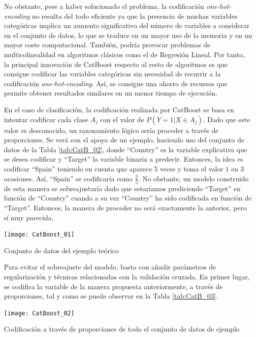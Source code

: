 \documentclass[12pt,twoside]{article}
\begin{document}
No obstante, pese a haber solucionado el problema, la codificación \textit{one-hot-encoding} no resulta del todo eficiente ya que la presencia de muchas variables categóricas implica un aumento significativo del número de variables a considerar en el conjunto de datos, lo que se traduce en un mayor uso de la memoria y en un mayor coste computacional. También, podría provocar problemas de multicolinealidad en algoritmos clásicos como el de Regresión Lineal. Por tanto, la principal innovación de CatBoost respecto al resto de algoritmos es que consigue codificar las variables categóricas sin necesidad de recurrir a la codificación \textit{one-hot-encoding}. Así, se consigue una ahorro de recursos que permite obtener resultados similares en un menor tiempo de ejecución.

En el caso de clasificación, la codificación realizada por CatBoost se basa en intentar codificar cada clase $A_j$ con el valor de $P(Y = 1 | X \in A_j)$. Dado que este valor es desconocido, un razonamiento lógico sería proceder a través de proporciones. Se verá con el apoyo de un ejemplo, haciendo uso del conjunto de datos de la Tabla \ref{tab:CatB_02}, donde ``Country'' es la variable explicativa que se desea codificar y ``Target'' la variable binaria a predecir. Entonces, la idea es codificar ``Spain'' teniendo en cuenta que aparece 5 veces y toma el valor $1$ en 3 ocasiones. Así, ``Spain'' se codificaría como $\frac{3}{5}$. No obstante, un modelo construido de esta manera se sobreajustaría dado que estaríamos prediciendo ``Target'' en función de ``Country'' cuando a su vez ``Country'' ha sido codificada en función de ``Target''. Entonces, la manera de proceder no será exactamente la anterior, pero sí muy parecida.

\begin{table}[h]
\centering
\texttt{[image: CatBoost\_01]}
\caption{Conjunto de datos del ejemplo teórico}
\label{tab:CatB_02}
\end{table}

Para evitar el sobreajuste del modelo, basta con añadir parámetros de regularización y técnicas relacionadas con la validación cruzada. En primer lugar, se codifica la variable de la manera propuesta anteriormente, a través de proporciones, tal y como se puede observar en la Tabla \ref{tab:CatB_03}.
\begin{table}[h]
\centering
\texttt{[image: CatBoost\_02]}
\caption{Codificación a través de proporciones de todo el conjunto de datos de ejemplo}
\label{tab:CatB_03}
\end{table}
\end{document}
